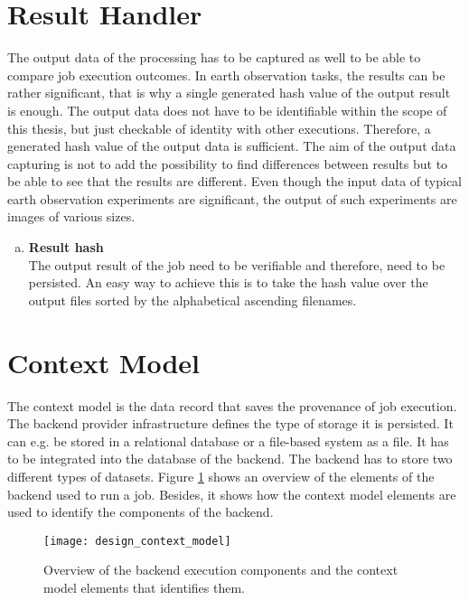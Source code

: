 \documentclass[draft,final]{vutinfth} %
\begin{document}
\section{Result Handler}\label{Design:Result Handler}
The output data of the processing has to be captured as well to be able to compare job execution outcomes. In earth observation tasks, the results can be rather significant, that is why a single generated hash value of the output result is enough. The output data does not have to be identifiable within the scope of this thesis, but just checkable of identity with other executions. Therefore, a generated hash value of the output data is sufficient. The aim of the output data capturing is not to add the possibility to find differences between results but to be able to see that the results are different. Even though the input data of typical earth observation experiments are significant, the output of such experiments are images of various sizes.   

\begin{enumerate}[(f)]
	\item \textbf{Result hash} \\
	The output result of the job need to be verifiable and therefore, need to be persisted. An easy way to achieve this is to take the hash value over the output files sorted by the alphabetical ascending filenames.
\end{enumerate}

 
\section{Context Model}\label{Design:Context Model}

The context model is the data record that saves the provenance of job execution.  The backend provider infrastructure defines the type of storage it is persisted. It can e.g. be stored in a relational database or a file-based system as a file. It has to be integrated into the database of the backend. The backend has to store two different types of datasets. Figure \ref{fig:design_contextmodel} shows an overview of the elements of the backend used to run a job. Besides, it shows how the context model elements are used to identify the components of the backend.

\begin{figure}[h]
	\centering
	\texttt{[image: design\_context\_model]}
	\caption{Overview of the backend execution components and the context model elements that identifies them.}
	\label{fig:design_contextmodel} 
\end{figure}
\end{document}
